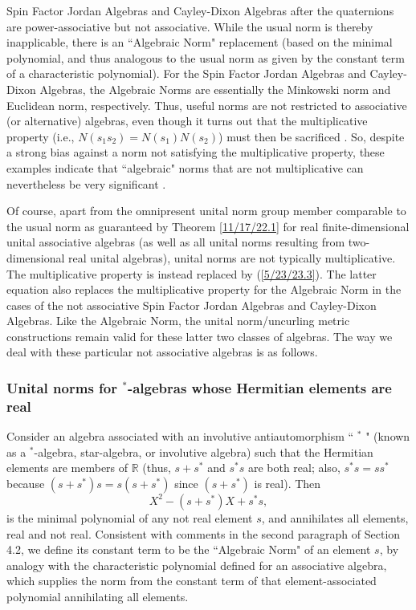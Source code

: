 \documentclass{amsart}
\numberwithin{equation}{section}
\theoremstyle{definition}
\numberwithin{theorem}{section}
\begin{document}
Spin Factor Jordan Algebras and Cayley-Dixon Algebras after the quaternions are power-associative but not associative.  While the usual norm is thereby inapplicable, there is an ``Algebraic Norm" replacement \cite{jacobson:1963} (based on the minimal polynomial, and thus analogous to the usual norm as given by the constant term of a characteristic polynomial).  For the Spin Factor Jordan Algebras and Cayley-Dixon Algebras, the Algebraic Norms are essentially the  Minkowski  norm and Euclidean norm, respectively.  Thus, useful norms are not restricted to associative (or alternative) algebras, even though it turns out that the multiplicative property (i.e., $N(s_1s_2)=N(s_1)N(s_2)$) must then be sacrificed  \cite{schafer:1963}. 
So, despite a strong bias against a norm not satisfying the multiplicative property, these examples indicate that ``algebraic" norms that are not multiplicative can nevertheless be very significant \cite{mccrimmon:2004}. 

Of course, apart from the omnipresent unital norm group member comparable to the usual norm as guaranteed by Theorem \ref{11/17/22.1} for real finite-dimensional unital associative algebras (as well as all unital norms resulting from two-dimensional real unital algebras), unital norms are not typically multiplicative.  The multiplicative property is instead replaced by (\ref{5/23/23.3}).  The latter equation also replaces the multiplicative property for the Algebraic Norm in the cases of the not associative Spin Factor Jordan Algebras and Cayley-Dixon Algebras. 
Like the Algebraic Norm, the unital norm/uncurling metric constructions remain valid for these latter two classes of algebras.  The way we deal with these particular not associative algebras is as follows.

\subsubsection{Unital norms for $^*$-algebras whose Hermitian elements are real} 

Consider an algebra associated with an involutive antiautomorphism ``
$^*$ " (known as a $^*$-algebra, star-algebra, or involutive algebra) such that the Hermitian elements are members of $\mathbb{R}$ (thus, $s+s^*$ and $s^*s$ are both real; also, $s^*s = ss^*$ because $(s+s^*)s = s(s+s^*)$ since $(s+s^*)$ is real). 
Then \[ X^2 - (s+s^*)X + s^*s, \] is the minimal polynomial of any not real element $s$, and annihilates all elements, real and not real.  Consistent with comments in the second paragraph of Section 4.2, we define its constant term to be the ``Algebraic Norm" of an element $s$, by analogy with the characteristic polynomial defined for an associative algebra, which supplies the norm from the constant term of that element-associated polynomial annihilating all elements.
\end{document}

